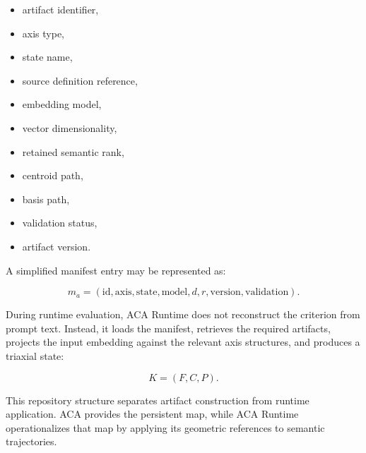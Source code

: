 \documentclass[11pt]{article}
\begin{document}
\begin{itemize}
\item artifact identifier,
\end{itemize}
\begin{itemize}
\item axis type,
\end{itemize}
\begin{itemize}
\item state name,
\end{itemize}
\begin{itemize}
\item source definition reference,
\end{itemize}
\begin{itemize}
\item embedding model,
\end{itemize}
\begin{itemize}
\item vector dimensionality,
\end{itemize}
\begin{itemize}
\item retained semantic rank,
\end{itemize}
\begin{itemize}
\item centroid path,
\end{itemize}
\begin{itemize}
\item basis path,
\end{itemize}
\begin{itemize}
\item validation status,
\end{itemize}
\begin{itemize}
\item artifact version.
\end{itemize}

A simplified manifest entry may be represented as:

$$
m_a =
(
\text{id},
\text{axis},
\text{state},
\text{model},
d,
r,
\text{version},
\text{validation}
).
$$

During runtime evaluation, ACA Runtime does not reconstruct the criterion from prompt text. Instead, it loads the manifest, retrieves the required artifacts, projects the input embedding against the relevant axis structures, and produces a triaxial state:

$$
K=(F,C,P).
$$

This repository structure separates artifact construction from runtime application. ACA provides the persistent map, while ACA Runtime operationalizes that map by applying its geometric references to semantic trajectories.
\end{document}
